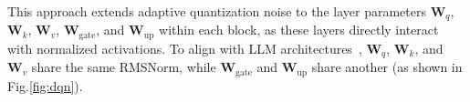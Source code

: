 This approach extends adaptive quantization noise to the layer parameters $\mathbf{W}_q$, $\mathbf{W}_k$, $\mathbf{W}_v$, $\mathbf{W}_{\text{gate}}$, and $\mathbf{W}_{\text{up}}$ within each block, as these layers directly interact with normalized activations. To align with LLM architectures~\citep{team2024qwen2,grattafiori2024llama}, $\mathbf{W}_q$, $\mathbf{W}_k$, and $\mathbf{W}_v$ share the same RMSNorm, while $\mathbf{W}_{\text{gate}}$ and $\mathbf{W}_{\text{up}}$ share another (as shown in Fig.\ref{fig:dqn}). 










